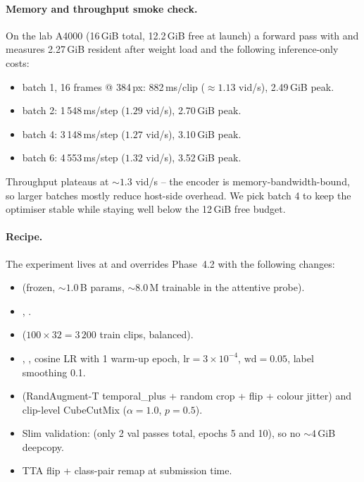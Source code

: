 \paragraph{Memory and throughput smoke check.}
On the lab A4000 (16\,GiB total, 12.2\,GiB free at launch) a forward
pass with  and  measures
2.27\,GiB resident after weight load and the following inference-only
costs:
\begin{itemize}
  \item batch 1, 16 frames @ 384\,px: 882\,ms/clip (\(\approx 1.13\)
        vid/s), 2.49\,GiB peak.
  \item batch 2: 1\,548\,ms/step (\(1.29\) vid/s), 2.70\,GiB peak.
  \item batch 4: 3\,148\,ms/step (\(1.27\) vid/s), 3.10\,GiB peak.
  \item batch 6: 4\,553\,ms/step (\(1.32\) vid/s), 3.52\,GiB peak.
\end{itemize}
Throughput plateaus at \(\sim\!1.3\) vid/s -- the encoder is
memory-bandwidth-bound, so larger batches mostly reduce host-side
overhead. We pick batch 4 to keep the optimiser stable while staying
well below the 12\,GiB free budget.

\paragraph{Recipe.}
The experiment lives at
and overrides Phase~4.2 with the following changes:
\begin{itemize}
  \item {}
        (frozen, \(\sim\!1.0\,\)B params, \(\sim\!8.0\,\)M trainable
        in the attentive probe).
  \item {}, .
  \item {} (\(100\!\times\!32
        = 3\,200\) train clips, balanced).
  \item {}, , cosine LR
        with 1 warm-up epoch, \(\text{lr}{=}3\!\times\!10^{-4}\),
        \(\text{wd}{=}0.05\), label smoothing 0.1.
  \item {} (RandAugment-T temporal\_plus +
        random crop + flip + colour jitter) and clip-level CubeCutMix
        (\(\alpha{=}1.0\), \(p{=}0.5\)).
  \item Slim validation:  (only
        2 val passes total, epochs 5 and 10),  so no \(\sim\!4\,\)GiB deepcopy.
  \item TTA flip + class-pair remap at submission time.
\end{itemize}

